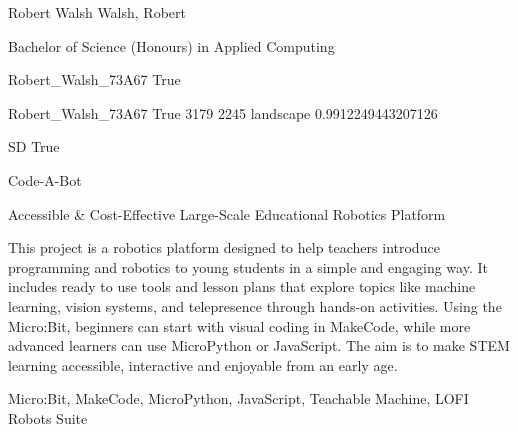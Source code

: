 \documentclass[twoside]{report}
\begin{document}
\begingroup{}\relax



\def\Key{Robert_Walsh_73A67}

{Robert Walsh}
{Walsh, Robert}

{Bachelor of Science (Honours) in Applied Computing}

{Robert_Walsh_73A67}
{True}

{Robert_Walsh_73A67}
{True}
{3179}
{2245}
{landscape}
{0.9912249443207126}

{SD}
{True}

{Code-A-Bot}

{Accessible \& Cost-Effective Large-Scale Educational Robotics Platform}

{This project is a robotics platform designed to help teachers introduce programming and robotics to young students in a simple and engaging way. It includes ready to use tools and lesson plans that explore topics like machine learning, vision systems, and telepresence through hands-on activities. Using the Micro:Bit, beginners can start with visual coding in MakeCode, while more advanced learners can use MicroPython or JavaScript. The aim is to make STEM learning accessible, interactive and enjoyable from an early age.}

{Micro:Bit, MakeCode, MicroPython, JavaScript, Teachable Machine, LOFI Robots Suite}
\end{document}
